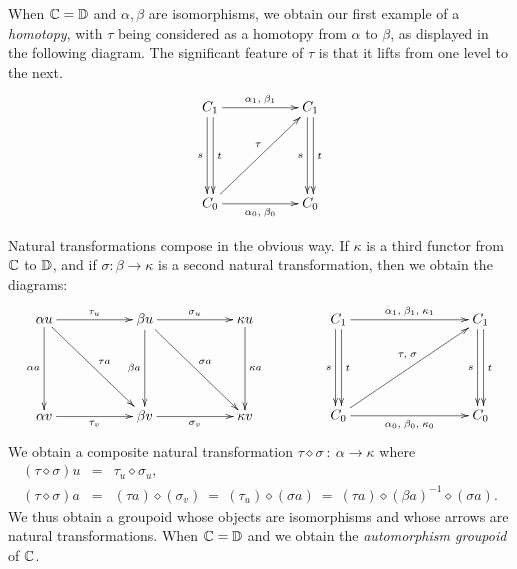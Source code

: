 When $\mathbb{C}=\mathbb{D}$ and $\alpha,\beta$ are isomorphisms, 
we obtain our first example of a \emph{homotopy}, 
with $\tau$ being considered as a homotopy from $\alpha$ to $\beta$, 
as displayed in the following diagram. 
The significant feature of $\tau$ is that it lifts from one level to the next. 
$$
\xymatrix{ 
  C_1  \ar[rr]^{\alpha_1,\;\beta_1} \ar[dd]<-0.5ex>_s \ar[dd]<0.5ex>^t 
    &&  C_1   \ar[dd]<-0.5ex>_s \ar[dd]<0.5ex>^t \\
    &&  \\
  C_0  \ar[rr]_{\alpha_0,\;\beta_0} \ar[uurr]^(0.55){\tau}
    &&  C_0  \\
}
$$

\medskip
Natural transformations compose in the obvious way. 
If $\kappa$ is a third functor from $\mathbb{C}$ to $\mathbb{D}$, 
and if $\sigma : \beta \to \kappa$ is a second natural transformation, 
then we obtain the diagrams: 
$$
\xymatrix{ 
  \alpha u  \ar[rr]^{\tau_u} \ar[dd]_{\alpha a} \ar[rrdd]^{\tau a}
    &&  \beta u \ar[dd]_{\beta a} \ar[rr]^{\sigma_u} \ar[rrdd]^{\sigma a} 
        &&  \kappa u \ar[dd]^{\kappa a} \\
    &&  &&  \\
  \alpha v  \ar[rr]_{\tau_v} 
    &&  \beta v  \ar[rr]_{\sigma_v} 
        &&  \kappa v \\
}
\qquad\qquad
\xymatrix{ 
  C_1   \ar[rrr]^{\alpha_1,\;\beta_1,\;\kappa_1} 
        \ar[dd]<-0.5ex>_s \ar[dd]<0.5ex>^t 
    &&&  C_1   \ar[dd]<-0.5ex>_s \ar[dd]<0.5ex>^t \\
    &&&  \\
  C_0   \ar[rrr]_{\alpha_0,\;\beta_0,\;\kappa_0} 
        \ar[uurrr]^(0.55){\tau,\;\sigma}
    &&&  C_0  \\
}
$$ 
We obtain a composite natural transformation 
$\tau\diamond\sigma ~:~ \alpha \to \kappa$ where 
\begin{eqnarray*}
(\tau\diamond\sigma)u 
  &=&  \tau_u \diamond \sigma_u, \\ 
(\tau\diamond\sigma)a 
  &=&  (\tau a)\diamond(\sigma_v) 
       ~=~ (\tau_u)\diamond(\sigma a) 
       ~=~ (\tau a)\diamond(\beta a)^{-1}\diamond(\sigma a).
\end{eqnarray*}
We thus obtain a groupoid whose objects are isomorphisms and whose 
arrows are natural transformations. 
When $\mathbb{C}=\mathbb{D}$ and we obtain the \emph{automorphism groupoid} of $\mathbb{C}$. 

